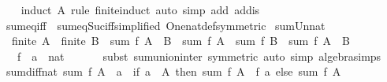 \begin{isabellebody}
%
\isadelimproof
\ \ %
\endisadelimproof
%
\isatagproof
{}\isamarkupfalse%
\ {\isacharparenleft}{\kern0pt}induct\ A\ rule{\isacharcolon}{\kern0pt}\ finite{\isacharunderscore}{\kern0pt}induct{\isacharparenright}{\kern0pt}\ {\isacharparenleft}{\kern0pt}auto\ simp\ add{\isacharcolon}{\kern0pt}\ add{\isacharunderscore}{\kern0pt}is{\isacharunderscore}{\kern0pt}{}{\isacharparenright}{\kern0pt}%
\endisatagproof
{\isafoldproof}%
%
\isadelimproof
\isanewline
%
\endisadelimproof
\isanewline
{}\isamarkupfalse%
\ sum{\isacharunderscore}{\kern0pt}eq{\isacharunderscore}{\kern0pt}{}{\isacharunderscore}{\kern0pt}iff\ {\isacharequal}{\kern0pt}\ sum{\isacharunderscore}{\kern0pt}eq{\isacharunderscore}{\kern0pt}Suc{}{\isacharunderscore}{\kern0pt}iff{\isacharbrackleft}{\kern0pt}simplified\ One{\isacharunderscore}{\kern0pt}nat{\isacharunderscore}{\kern0pt}def{\isacharbrackleft}{\kern0pt}symmetric{\isacharbrackright}{\kern0pt}{\isacharbrackright}{\kern0pt}\isanewline
\isanewline
{}\isamarkupfalse%
\ sum{\isacharunderscore}{\kern0pt}Un{\isacharunderscore}{\kern0pt}nat{\isacharcolon}{\kern0pt}\isanewline
\ \ {\isachardoublequoteopen}finite\ A\ {\isasymLongrightarrow}\ finite\ B\ {\isasymLongrightarrow}\ sum\ f\ {\isacharparenleft}{\kern0pt}A\ {\isasymunion}\ B{\isacharparenright}{\kern0pt}\ {\isacharequal}{\kern0pt}\ sum\ f\ A\ {\isacharplus}{\kern0pt}\ sum\ f\ B\ {\isacharminus}{\kern0pt}\ sum\ f\ {\isacharparenleft}{\kern0pt}A\ {\isasyminter}\ B{\isacharparenright}{\kern0pt}{\isachardoublequoteclose}\isanewline
\ \ \ f\ {\isacharcolon}{\kern0pt}{\isacharcolon}{\kern0pt}\ {\isachardoublequoteopen}{\isacharprime}{\kern0pt}a\ {\isasymRightarrow}\ nat{\isachardoublequoteclose}\isanewline
\ \ %
\isanewline
%
\isadelimproof
\ \ %
\endisadelimproof
%
\isatagproof
{}\isamarkupfalse%
\ {\isacharparenleft}{\kern0pt}subst\ sum{\isachardot}{\kern0pt}union{\isacharunderscore}{\kern0pt}inter\ {\isacharbrackleft}{\kern0pt}symmetric{\isacharbrackright}{\kern0pt}{\isacharparenright}{\kern0pt}\ {\isacharparenleft}{\kern0pt}auto\ simp{\isacharcolon}{\kern0pt}\ algebra{\isacharunderscore}{\kern0pt}simps{\isacharparenright}{\kern0pt}%
\endisatagproof
{\isafoldproof}%
%
\isadelimproof
\isanewline
%
\endisadelimproof
\isanewline
{}\isamarkupfalse%
\ sum{\isacharunderscore}{\kern0pt}diff{}{\isacharunderscore}{\kern0pt}nat{\isacharcolon}{\kern0pt}\ {\isachardoublequoteopen}sum\ f\ {\isacharparenleft}{\kern0pt}A\ {\isacharminus}{\kern0pt}\ {\isacharbraceleft}{\kern0pt}a{\isacharbraceright}{\kern0pt}{\isacharparenright}{\kern0pt}\ {\isacharequal}{\kern0pt}\ {\isacharparenleft}{\kern0pt}if\ a\ {\isasymin}\ A\ then\ sum\ f\ A\ {\isacharminus}{\kern0pt}\ f\ a\ else\ sum\ f\ A{\isacharparenright}{\kern0pt}{\isachardoublequoteclose}\isanewline

\end{isabellebody}
